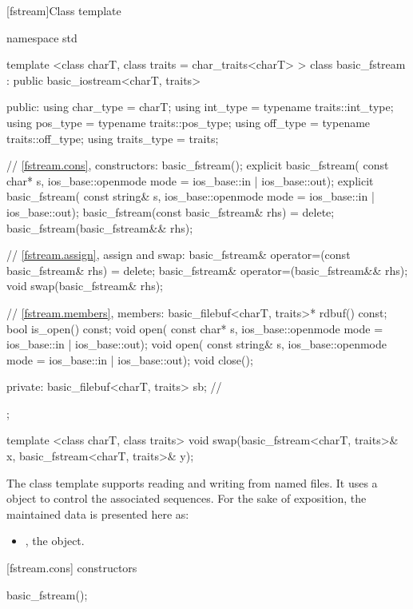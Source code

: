 [fstream]{Class template }

%
\begin{codeblock}
namespace std {
  template <class charT, class traits = char_traits<charT> >
  class basic_fstream
    : public basic_iostream<charT, traits> {
  public:
    using char_type   = charT;
    using int_type    = typename traits::int_type;
    using pos_type    = typename traits::pos_type;
    using off_type    = typename traits::off_type;
    using traits_type = traits;

    // \ref{fstream.cons}, constructors:
    basic_fstream();
    explicit basic_fstream(
      const char* s,
      ios_base::openmode mode = ios_base::in | ios_base::out);
    explicit basic_fstream(
      const string& s,
      ios_base::openmode mode = ios_base::in | ios_base::out);
    basic_fstream(const basic_fstream& rhs) = delete;
    basic_fstream(basic_fstream&& rhs);

    // \ref{fstream.assign}, assign and swap:
    basic_fstream& operator=(const basic_fstream& rhs) = delete;
    basic_fstream& operator=(basic_fstream&& rhs);
    void swap(basic_fstream& rhs);

    // \ref{fstream.members}, members:
    basic_filebuf<charT, traits>* rdbuf() const;
    bool is_open() const;
    void open(
      const char* s,
      ios_base::openmode mode = ios_base::in | ios_base::out);
    void open(
      const string& s,
      ios_base::openmode mode = ios_base::in | ios_base::out);
    void close();

  private:
    basic_filebuf<charT, traits> sb; // \expos
  };

  template <class charT, class traits>
    void swap(basic_fstream<charT, traits>& x,
              basic_fstream<charT, traits>& y);
}
\end{codeblock}

\pnum
The
class template
supports reading and writing from named files.
It uses a
object to control the associated sequences.
For the sake of exposition, the maintained data is presented here as:
\begin{itemize}
\item
{}, the  object.
\end{itemize}

[fstream.cons]{ constructors}

%
\begin{itemdecl}
basic_fstream();
\end{itemdecl}

